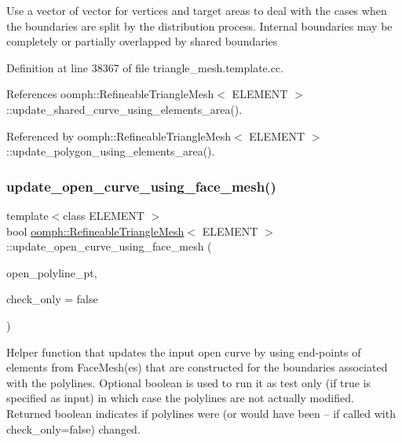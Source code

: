 Use a vector of vector for vertices and target areas to deal with the cases when the boundaries are split by the distribution process. Internal boundaries may be completely or partially overlapped by shared boundaries 

Definition at line 38367 of file triangle\+\_\+mesh.\+template.\+cc.



References oomph\+::\+Refineable\+Triangle\+Mesh$<$ E\+L\+E\+M\+E\+N\+T $>$\+::update\+\_\+shared\+\_\+curve\+\_\+using\+\_\+elements\+\_\+area().



Referenced by oomph\+::\+Refineable\+Triangle\+Mesh$<$ E\+L\+E\+M\+E\+N\+T $>$\+::update\+\_\+polygon\+\_\+using\+\_\+elements\+\_\+area().

\mbox{\label{classoomph_1_1RefineableTriangleMesh_ab8fb7db201e871f082afe3170ddb812f}} 
\subsubsection{\texorpdfstring{update\+\_\+open\+\_\+curve\+\_\+using\+\_\+face\+\_\+mesh()}{update\_open\_curve\_using\_face\_mesh()}}
{\footnotesize\ttfamily template$<$class E\+L\+E\+M\+E\+NT $>$ \\
bool \hyperlink{classoomph_1_1RefineableTriangleMesh}{oomph\+::\+Refineable\+Triangle\+Mesh}$<$ E\+L\+E\+M\+E\+NT $>$\+::update\+\_\+open\+\_\+curve\+\_\+using\+\_\+face\+\_\+mesh (\begin{DoxyParamCaption}\item[{Triangle\+Mesh\+Open\+Curve $\ast$}]{open\+\_\+polyline\+\_\+pt,  }\item[{const bool \&}]{check\+\_\+only = {\ttfamily false} }\end{DoxyParamCaption})\hspace{0.3cm}{\ttfamily [protected]}}



Helper function that updates the input open curve by using end-\/points of elements from Face\+Mesh(es) that are constructed for the boundaries associated with the polylines. Optional boolean is used to run it as test only (if true is specified as input) in which case the polylines are not actually modified. Returned boolean indicates if polylines were (or would have been -- if called with check\+\_\+only=false) changed. 

